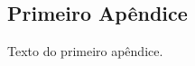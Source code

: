 \begin{apendicesenv}

\partapendices

\chapter{Primeiro Apêndice}

Texto do primeiro apêndice.

\end{apendicesenv}

